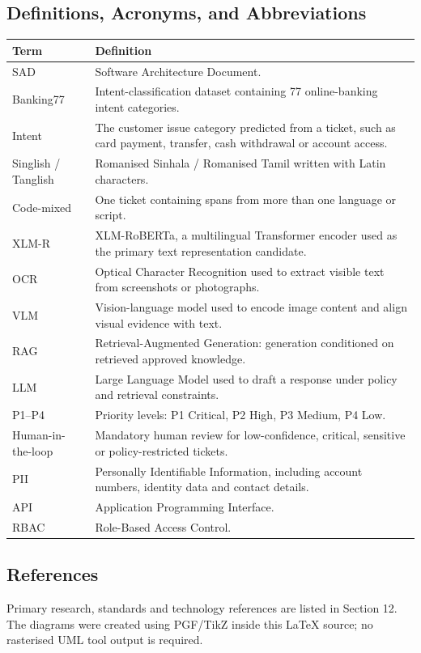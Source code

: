 \documentclass[10pt,letterpaper]{article}
\begin{document}
\subsection{Definitions, Acronyms, and Abbreviations}
\begin{longtable}{|L{1.35in}|L{5.65in}|}\hline
\textbf{Term} & \textbf{Definition}\\\hline
SAD & Software Architecture Document.\\\hline
Banking77 & Intent-classification dataset containing 77 online-banking intent categories.\\\hline
Intent & The customer issue category predicted from a ticket, such as card payment, transfer, cash withdrawal or account access.\\\hline
Singlish / Tanglish & Romanised Sinhala / Romanised Tamil written with Latin characters.\\\hline
Code-mixed & One ticket containing spans from more than one language or script.\\\hline
XLM-R & XLM-RoBERTa, a multilingual Transformer encoder used as the primary text representation candidate.\\\hline
OCR & Optical Character Recognition used to extract visible text from screenshots or photographs.\\\hline
VLM & Vision-language model used to encode image content and align visual evidence with text.\\\hline
RAG & Retrieval-Augmented Generation: generation conditioned on retrieved approved knowledge.\\\hline
LLM & Large Language Model used to draft a response under policy and retrieval constraints.\\\hline
P1--P4 & Priority levels: P1 Critical, P2 High, P3 Medium, P4 Low.\\\hline
Human-in-the-loop & Mandatory human review for low-confidence, critical, sensitive or policy-restricted tickets.\\\hline
PII & Personally Identifiable Information, including account numbers, identity data and contact details.\\\hline
API & Application Programming Interface.\\\hline
RBAC & Role-Based Access Control.\\\hline
\end{longtable}

\subsection{References}
Primary research, standards and technology references are listed in Section 12. The diagrams were created using PGF/TikZ inside this LaTeX source; no rasterised UML tool output is required.
\end{document}
